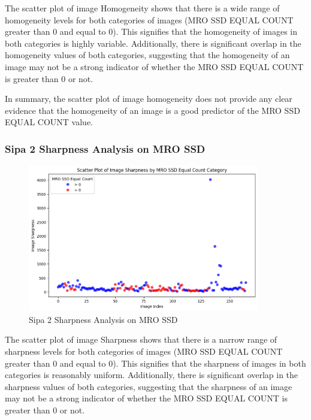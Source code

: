 The scatter plot of image Homogeneity shows that there is a wide range of homogeneity levels for both categories of images (MRO SSD EQUAL COUNT greater than 0 and equal to 0). This signifies that the homogeneity of images in both categories is highly variable. Additionally, there is significant overlap in the homogeneity values of both categories, suggesting that the homogeneity of an image may not be a strong indicator of whether the MRO SSD EQUAL COUNT is greater than 0 or not.



In summary, the scatter plot of image homogeneity does not provide any clear evidence that the homogeneity of an image is a good predictor of the MRO SSD EQUAL COUNT value.

\newpage

\subsubsection{Sipa 2 Sharpness Analysis on MRO SSD}


\begin{figure}[ht]
    \centering
    \includegraphics[width=0.9\textwidth]{Figures/Results/sipa_02/sharpness.png}
    \caption[Sipa 2 Sharpness Analysis on MRO SSD]{Sipa 2 Sharpness Analysis on MRO SSD}
    \label{fig:Sipa 2 Sharpness Analysis on MRO SSD}
\end{figure}



The scatter plot of image Sharpness shows that there is a narrow range of sharpness levels for both categories of images (MRO SSD EQUAL COUNT greater than 0 and equal to 0). This signifies that the sharpness of images in both categories is reasonably uniform. Additionally, there is significant overlap in the sharpness values of both categories, suggesting that the sharpness of an image may not be a strong indicator of whether the MRO SSD EQUAL COUNT is greater than 0 or not.

